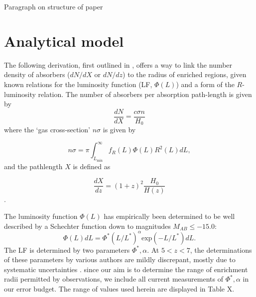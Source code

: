 \documentclass[useAMS,usenatbib]{mn2e}
\begin{document}

Paragraph on structure of paper


\section{Analytical model}

The following derivation, first outlined in \citet{Steidel95}, offers a way to link the number density of absorbers ($dN/dX$ or $dN/dz$) to the radius of enriched regions, given known relations for the luminosity function (LF, $\Phi(L)$) and a form of the $R$-luminosity relation.
The number of absorbers per absorption path-length is given by
\begin{equation}
\frac{dN}{dX} =  \frac{c \sigma n}{H_0} 
\end{equation}
where the `gas cross-section' $n\sigma$ is given by

\begin{equation}
n \sigma = \pi \int_{L_\text{min}}^\infty f_R(L) \Phi(L) R^2(L) dL,
\end{equation}
and the pathlength $X$ is defined as 

\begin{equation}
\frac{dX}{dz} = \left(1+z\right)^2 \frac{H_0}{H(z)}
\end{equation}.

The luminosity function $\Phi(L)$ has empirically been determined to be well described by a Schechter function down to magnitudes $M_{AB}\leq-15.0$:
\begin{equation} 
\Phi(L) dL = \Phi^* (L/L^*)^\alpha \text{exp} (-L/L^*) dL.
\end{equation}
The LF is determined by two parameters ${\Phi^*,\alpha}$. At $5<z<7$, the determinations of these parameters by various authors are mildly discrepant, mostly due to systematic uncertainties \citep{Bouwens16}. since our aim is to determine the range of enrichment radii permitted by observations, we include all current measurements of ${\Phi^*,\alpha}$ in our error budget. The range of values used herein are displayed in Table X.
\end{document}
